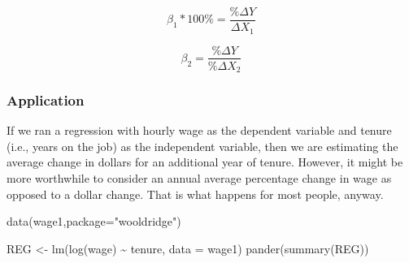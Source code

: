 \documentclass[
]{book}
\newenvironment{Shaded}{\begin{snugshade}}{\end{snugshade}}
\newcommand{\AttributeTok}[1]{\textcolor[rgb]{0.77,0.63,0.00}{#1}}
\newcommand{\FunctionTok}[1]{\textcolor[rgb]{0.00,0.00,0.00}{#1}}
\newcommand{\NormalTok}[1]{#1}
\newcommand{\OtherTok}[1]{\textcolor[rgb]{0.56,0.35,0.01}{#1}}
\newcommand{\SpecialCharTok}[1]{\textcolor[rgb]{0.00,0.00,0.00}{#1}}
\newcommand{\StringTok}[1]{\textcolor[rgb]{0.31,0.60,0.02}{#1}}
\begin{document}
\[\beta_1 * 100\% = \frac{\% \Delta Y}{\Delta X_1}\]

\[\beta_2= \frac{\% \Delta Y}{\%\Delta X_2}\]

\hypertarget{application-5}{%
\subsubsection*{Application}\label{application-5}}

If we ran a regression with hourly wage as the dependent variable and tenure (i.e., years on the job) as the independent variable, then we are estimating the average change in dollars for an additional year of tenure. However, it might be more worthwhile to consider an annual average percentage change in wage as opposed to a dollar change. That is what happens for most people, anyway.

\begin{Shaded}
\begin{Highlighting}[]
\FunctionTok{data}\NormalTok{(wage1,}\AttributeTok{package=}\StringTok{"wooldridge"}\NormalTok{)}

\NormalTok{REG }\OtherTok{\textless{}{-}} \FunctionTok{lm}\NormalTok{(}\FunctionTok{log}\NormalTok{(wage) }\SpecialCharTok{\textasciitilde{}}\NormalTok{ tenure, }\AttributeTok{data =}\NormalTok{ wage1)}
\FunctionTok{pander}\NormalTok{(}\FunctionTok{summary}\NormalTok{(REG))}
\end{Highlighting}
\end{Shaded}
\end{document}
